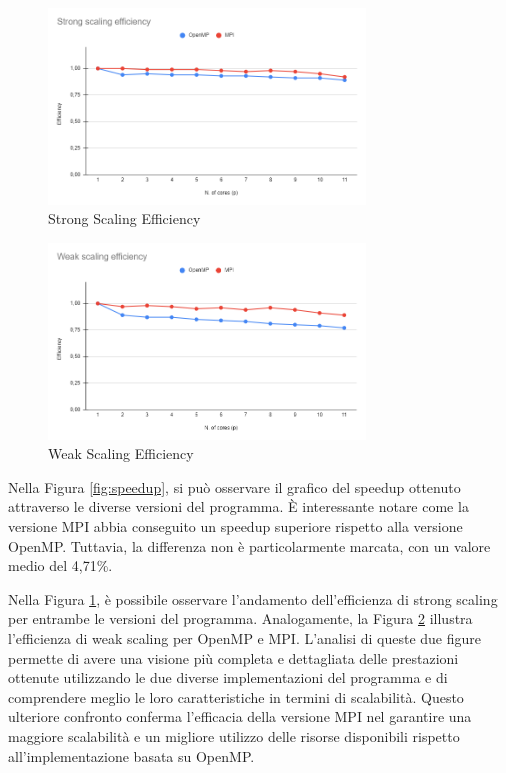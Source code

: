 \documentclass[a4paper,12pt, oneside]{article}
\begin{document}
\begin{figure}[h]
    \centering
    \includegraphics[width=0.75\textwidth]{strong-scaling.png}
    \caption{Strong Scaling Efficiency}
    \label{fig:strong-scaling}
\end{figure}

\begin{figure}[h]
    \centering
    \includegraphics[width=0.75\textwidth]{weak-scaling.png}
    \caption{Weak Scaling Efficiency}
    \label{fig:weak-scaling}
\end{figure}

Nella Figura \ref{fig:speedup}, si può osservare il grafico del speedup ottenuto attraverso
le diverse versioni del programma. È interessante notare come la versione MPI abbia
conseguito un speedup superiore rispetto alla versione OpenMP. Tuttavia, la differenza non
è particolarmente marcata, con un valore medio del 4,71\%.

Nella Figura \ref{fig:strong-scaling}, è possibile osservare l'andamento dell'efficienza di
strong scaling per entrambe le versioni del programma. Analogamente, la Figura \ref{fig:weak-scaling}
illustra l'efficienza di weak scaling per OpenMP e MPI. L'analisi di queste due figure
permette di avere una visione più completa e dettagliata delle prestazioni ottenute
utilizzando le due diverse implementazioni del programma e di comprendere meglio le loro
caratteristiche in termini di scalabilità. Questo ulteriore confronto conferma l'efficacia
della versione MPI nel garantire una maggiore scalabilità e un migliore utilizzo delle
risorse disponibili rispetto all'implementazione basata su OpenMP.
\end{document}
